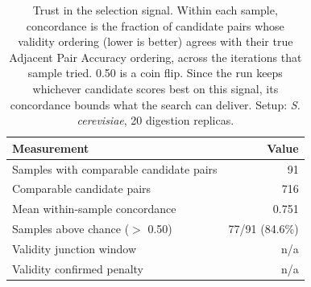 \begin{table}[!tb]
  \centering
  \caption{Trust in the selection signal. Within each sample, concordance is the fraction of candidate pairs whose validity ordering (lower is better) agrees with their true Adjacent Pair Accuracy ordering, across the iterations that sample tried. 0.50 is a coin flip. Since the run keeps whichever candidate scores best on this signal, its concordance bounds what the search can deliver. Setup: \textnormal{\textnormal{\textit{S. cerevisiae}}}, 20 digestion replicas.}
  \label{tab:validity_concordance_yeast_r20}
  \begin{tabular}{lr}
    \toprule
    Measurement & Value \\
    \midrule
    Samples with comparable candidate pairs & 91 \\
    Comparable candidate pairs & 716 \\
    Mean within-sample concordance & 0.751 \\
    Samples above chance ($>$ 0.50) & 77/91 (84.6\%) \\
    Validity junction window & n/a \\
    Validity confirmed penalty & n/a \\
    \bottomrule
  \end{tabular}
\end{table}

